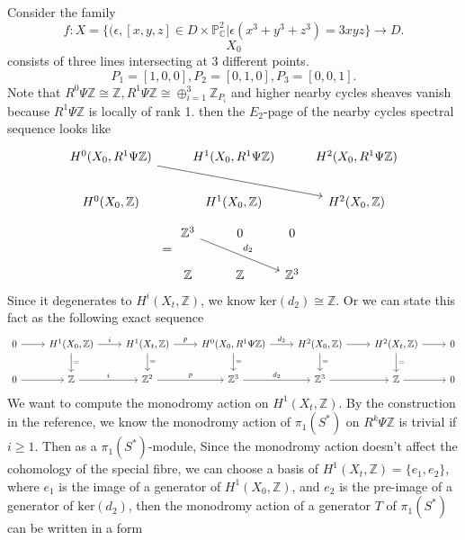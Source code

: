 \documentclass[../main.tex]{subfiles}
\begin{document}
\begin{example}
Consider the family 
$$f: X=\{(\epsilon, [x,y,z]\in D\times \mathbb{P}_{\mathbb{C}}^{2}|\epsilon(x^{3}+y^{3}+z^{3})=3xyz\}\rightarrow D.$$
$$X_{0}$$ consists of three lines intersecting at $3$ different points. 
$$P_{1}=[1,0,0], P_{2}=[0,1,0], P_{3}=[0,0,1].$$
Note that $R^{0}\Psi\mathbb{Z}\cong \mathbb{Z}, R^{1}\Psi\mathbb{Z}\cong \oplus_{i=1}^{3}\mathbb{Z}_{P_{i}}$ and higher nearby cycles sheaves vanish because $R^{1}\Psi\mathbb{Z}$ is locally of rank 1. then the $E_{2}$-page of the nearby cycles spectral sequence looks like 
$$
\begin{tikzcd}
H^{0}(X_{0}, R^{1}\Psi\mathbb{Z})\arrow{drr} & H^{1}(X_{0}, R^{1}\Psi\mathbb{Z}) & H^{2}(X_{0}, R^{1}\Psi\mathbb{Z})\\
H^{0}(X_{0}, \mathbb{Z}) & H^{1}(X_{0}, \mathbb{Z}) & H^{2}(X_{0}, \mathbb{Z})
\end{tikzcd}
$$
$$
=\begin{tikzcd}
 \mathbb{Z}^{3}\arrow{drr}{d_{2}} & 0 & 0\\
\mathbb{Z} & \mathbb{Z} & \mathbb{Z}^{3}
\end{tikzcd}
$$
Since it degenerates to $H^{i}(X_{t}, \mathbb{Z})$, we know $\mathrm{ker}(d_{2})\cong \mathbb{Z}$. Or we can state this fact as the following exact sequence 
$$\begin{tikzcd}
0\arrow{r} & H^{1}(X_{0}, \mathbb{Z})\arrow{r}{i}\arrow{d}{=} & H^{1}(X_{t}, \mathbb{Z})\arrow{r}{p}\arrow{d}{=}&  H^{0}(X_{0}, R^{1}\Psi\mathbb{Z})\arrow{r}{d_{2}}\arrow{d}{=} & H^{2}(X_{0}, \mathbb{Z})\arrow{r}\arrow{d}{=}&  H^{2}(X_{t}, \mathbb{Z})\arrow{r}\arrow{d}{=}& 0\\
0\arrow{r} & \mathbb{Z}\arrow{r}{i} & \mathbb{Z}^{2}\arrow{r}{p}& \mathbb{Z}^{3}\arrow{r}{d_{2}} & \mathbb{Z}^{3}\arrow{r}&  \mathbb{Z}\arrow{r}& 0
\end{tikzcd}$$
We want to compute the monodromy action on $H^{1}(X_{t}, \mathbb{Z})$. By the construction in the reference, we know the monodromy action of $\pi_{1}(S^{*})$ on $R^{k}\Psi\mathbb{Z}$ is trivial if $i\geq 1$. Then as a $\pi_{1}(S^{*})$-module, 
Since the monodromy action doesn't affect the cohomology of the special fibre, we can choose a basis of $H^{1}(X_{t}, \mathbb{Z})=\{e_{1}, e_{2}\}$, where $e_{1}$ is the image of a generator of $H^{1}(X_{0}, \mathbb{Z})$, and $e_{2}$ is the pre-image of a generator of $\mathrm{ker}(d_{2})$, then the monodromy action of a generator $T$ of $\pi_{1}(S^{*})$ can be written in a form

\end{example}
\end{document}
